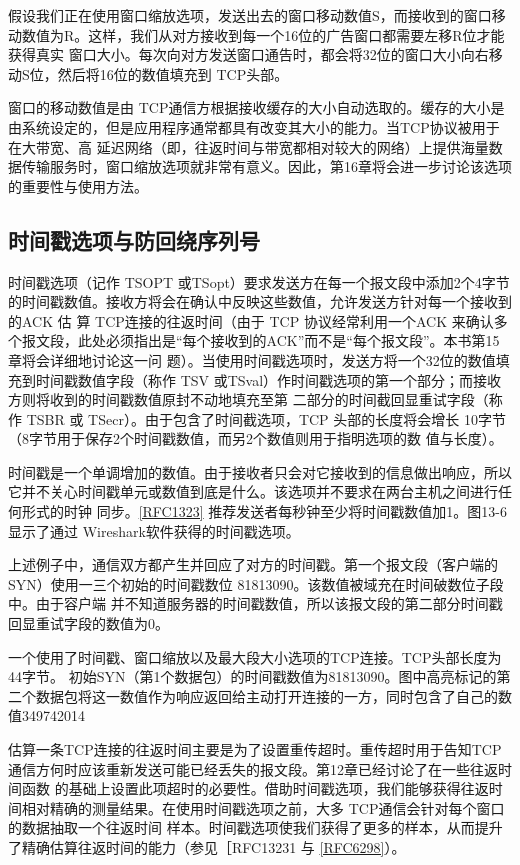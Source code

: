 假设我们正在使用窗口缩放选项，发送出去的窗口移动数值S，而接收到的窗口移动数值为R。这样，我们从对方接收到每一个16位的广告窗口都需要左移R位才能获得真实
窗口大小。每次向对方发送窗口通告时，都会将32位的窗口大小向右移动S位，然后将16位的数值填充到 TCP头部。

窗口的移动数值是由 TCP通信方根据接收缓存的大小自动选取的。缓存的大小是由系统设定的，但是应用程序通常都具有改变其大小的能力。当TCP协议被用于在大带宽、高
延迟网络（即，往返时间与带宽都相对较大的网络）上提供海量数据传输服务时，窗口缩放选项就非常有意义。因此，第16章将会进一步讨论该选项的重要性与使用方法。

\subsection{时间戳选项与防回绕序列号}
时间戳选项（记作 TSOPT
或TSopt）要求发送方在每一个报文段中添加2个4字节的时间戳数值。接收方将会在确认中反映这些数值，允许发送方针对每一个接收到的ACK 估
算 TCP连接的往返时间（由于 TCP 协议经常利用一个ACK
来确认多个报文段，此处必须指出是“每个接收到的ACK”而不是“每个报文段”。本书第15 章将会详细地讨论这一问
题）。当使用时间戳选项时，发送方将一个32位的数值填充到时间戳数值字段（称作 TSV
或TSval）作时间戳选项的第一个部分；而接收方则将收到的时间戳数值原封不动地填充至第
二部分的时间截回显重试字段（称作 TSBR 或 TSecr）。由于包含了时间截选项，TCP 头部的长度将会增长
10字节（8字节用于保存2个时间戳数值，而另2个数值则用于指明选项的数
值与长度）。

时间戳是一个单调增加的数值。由于接收者只会对它接收到的信息做出响应，所以它并不关心时间戳单元或数值到底是什么。该选项并不要求在两台主机之间进行任何形式的时钟
同步。\href{https://www.rfc-editor.org/rfc/rfc1323}{[RFC1323]}
推荐发送者每秒钟至少将时间戳数值加1。图13-6显示了通过 Wireshark软件获得的时间戳选项。

上述例子中，通信双方都产生并回应了对方的时间戳。第一个报文段（客户端的SYN）使用一三个初始的时间戳数位
81813090。该数值被域充在时间破数位子段中。由于容户端
并不知道服务器的时间戳数值，所以该报文段的第二部分时间戳回显重试字段的数值为0。

一个使用了时间戳、窗口缩放以及最大段大小选项的TCP连接。TCP头部长度为44字节。
初始SYN（第1个数据包）的时间戳数值为81813090。图中高亮标记的第二个数据包将这一数值作为响应返回给主动打开连接的一方，同时包含了自己的数值349742014

估算一条TCP连接的往返时间主要是为了设置重传超时。重传超时用于告知TCP通信方何时应该重新发送可能已经丢失的报文段。第12章已经讨论了在一些往返时间函数
的基础上设置此项超时的必要性。借助时间戳选项，我们能够获得往返时间相对精确的测量结果。在使用时间戳选项之前，大多 TCP通信会针对每个窗口的数据抽取一个往返时间
样本。时间戳选项使我们获得了更多的样本，从而提升了精确估算往返时间的能力（参见［RFC13231 与
\href{https://www.rfc-editor.org/rfc/rfc6298}{[RFC6298]}）。

